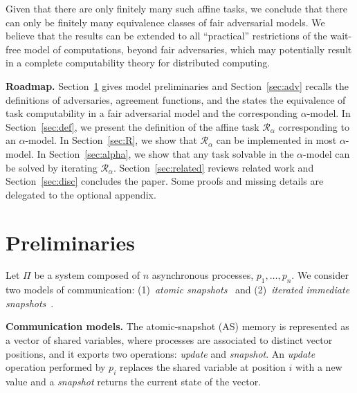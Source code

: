 \documentclass[a4paper]{article}
\newcommand{\myparagraph}[1]{\vspace{6pt}\noindent \textbf{#1}}
\def\R{\ensuremath{\mathcal{R}}}
\begin{document}
Given that there are only finitely many such affine tasks, we conclude
that there can only be finitely many equivalence classes of fair
adversarial models. We believe that the results can be extended to
all ``practical'' restrictions of the wait-free model of computations, beyond fair
adversaries, which may potentially result in a complete computability
theory for distributed computing.    

\myparagraph{Roadmap.} 
Section~\ref{sec:model} gives model preliminaries and
Section~\ref{sec:adv} recalls the definitions of adversaries,
agreement functions, and the states the equivalence of
task computability in a fair adversarial model and the corresponding
$\alpha$-model.  
In Section~\ref{sec:def}, we present the definition of the affine task
$\R_{\alpha}$ corresponding to an $\alpha$-model.
In Section~\ref{sec:R}, we show that $\R_{\alpha}$ can be implemented
in most $\alpha$-model. 
In Section~\ref{sec:alpha}, we show that any task solvable in 
the $\alpha$-model can be solved by iterating $\R_{\alpha}$.
Section~\ref{sec:related} reviews related work and
Section~\ref{sec:disc} concludes the paper.
%
Some proofs and missing details are delegated to the
optional appendix.






\section{Preliminaries}
\label{sec:model}

Let $\Pi$ be a system composed of $n$ asynchronous processes, 
$p_1,\ldots,p_n$. We consider two models of communication: 
(1)~\emph{atomic snapshots}~\cite{AADGMS93} and 
(2)~\emph{iterated immediate snapshots}~\cite{BG97,HS99}.

\myparagraph{Communication models.}
%
The atomic-snapshot (AS) memory is represented as a vector of 
shared variables, where processes are associated to distinct 
vector positions, and it exports two operations: \emph{update} and 
\emph{snapshot}. An \emph{update} operation performed by $p_i$ 
replaces the shared variable at position $i$ with a new value 
and a \emph{snapshot} returns the current state of the vector. 
\end{document}
